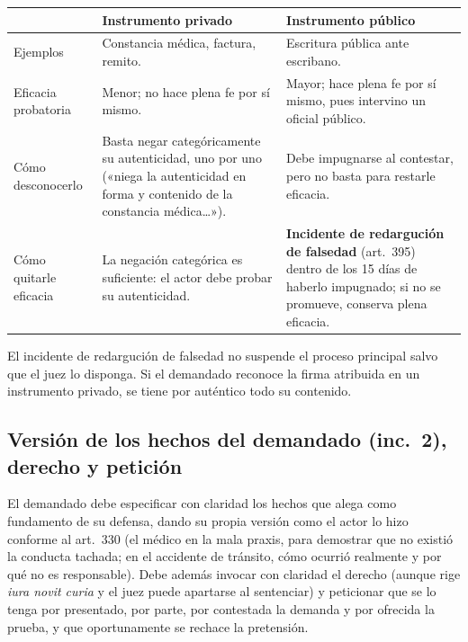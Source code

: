 \documentclass[12pt,oneside]{book}
\renewcommand{\arraystretch}{1.15}
\begin{document}
\begin{table}[H]
\centering
\renewcommand{\arraystretch}{1.25}
\begin{tabularx}{\textwidth}{>{\RaggedRight\arraybackslash}p{}>{\RaggedRight\arraybackslash}X>{\RaggedRight\arraybackslash}X}
\toprule
 & \textbf{Instrumento privado} & \textbf{Instrumento público} \\
\midrule
Ejemplos & Constancia médica, factura, remito. & Escritura pública ante escribano. \\
Eficacia probatoria & Menor; no hace plena fe por sí mismo. & Mayor; hace plena fe por sí mismo, pues intervino un oficial público. \\
Cómo desconocerlo & Basta negar categóricamente su autenticidad, uno por uno («niega la autenticidad en forma y contenido de la constancia médica\ldots»). & Debe impugnarse al contestar, pero no basta para restarle eficacia. \\
Cómo quitarle eficacia & La negación categórica es suficiente: el actor debe probar su autenticidad. & \textbf{Incidente de redargución de falsedad} (art.~395) dentro de los 15 días de haberlo impugnado; si no se promueve, conserva plena eficacia. \\
\bottomrule
\end{tabularx}
\end{table}

El incidente de redargución de falsedad no suspende el proceso principal salvo que el juez lo disponga. Si el demandado reconoce la firma atribuida en un instrumento privado, se tiene por auténtico todo su contenido.

\subsection{Versión de los hechos del demandado (inc.~2), derecho y petición}

El demandado debe especificar con claridad los hechos que alega como fundamento de su defensa, dando su propia versión como el actor lo hizo conforme al art.~330 (el médico en la mala praxis, para demostrar que no existió la conducta tachada; en el accidente de tránsito, cómo ocurrió realmente y por qué no es responsable). Debe además invocar con claridad el derecho (aunque rige \textit{iura novit curia} y el juez puede apartarse al sentenciar) y peticionar que se lo tenga por presentado, por parte, por contestada la demanda y por ofrecida la prueba, y que oportunamente se rechace la pretensión.
\end{document}
